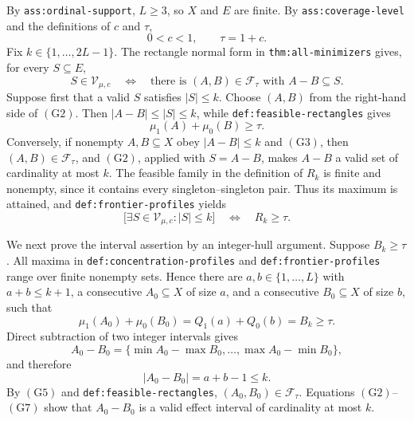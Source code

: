 By \texttt{ass:ordinal-support}, \(L\geq 3\), so \(X\) and \(E\) are finite.  By \texttt{ass:coverage-level} and the definitions of \(c\) and \(\tau\),
\[
0<c<1,\qquad \tau=1+c.
\tag{G1}
\]
Fix \(k\in\{1,\ldots,2L-1\}\).  The rectangle normal form in \texttt{thm:all-minimizers} gives, for every \(S\subseteq E\),
\[
S\in\mathcal V_{\mu,c}
\quad\Longleftrightarrow\quad
\text{there is }(A,B)\in\mathcal F_\tau\text{ with }A-B\subseteq S.
\tag{G2}
\]
Suppose first that a valid \(S\) satisfies \(|S|\leq k\).  Choose \((A,B)\) from the right-hand side of \((\mathrm{G2})\).  Then \(|A-B|\leq |S|\leq k\), while \texttt{def:feasible-rectangles} gives
\[
\mu_1(A)+\mu_0(B)\geq\tau.
\tag{G3}
\]
Conversely, if nonempty \(A,B\subseteq X\) obey \(|A-B|\leq k\) and \((\mathrm{G3})\), then \((A,B)\in\mathcal F_\tau\), and \((\mathrm{G2})\), applied with \(S=A-B\), makes \(A-B\) a valid set of cardinality at most \(k\).  The feasible family in the definition of \(R_k\) is finite and nonempty, since it contains every singleton--singleton pair.  Thus its maximum is attained, and \texttt{def:frontier-profiles} yields
\[
\bigl[\exists S\in\mathcal V_{\mu,c}:|S|\leq k\bigr]
\quad\Longleftrightarrow\quad R_k\geq\tau.
\tag{G4}
\]

We next prove the interval assertion by an integer-hull argument.  Suppose \(B_k\geq\tau\).  All maxima in \texttt{def:concentration-profiles} and \texttt{def:frontier-profiles} range over finite nonempty sets.  Hence there are \(a,b\in\{1,\ldots,L\}\) with \(a+b\leq k+1\), a consecutive \(A_0\subseteq X\) of size \(a\), and a consecutive \(B_0\subseteq X\) of size \(b\), such that
\[
\mu_1(A_0)+\mu_0(B_0)=Q_1(a)+Q_0(b)=B_k\geq\tau.
\tag{G5}
\]
Direct subtraction of two integer intervals gives
\[
A_0-B_0
=\{\min A_0-\max B_0,\ldots,\max A_0-\min B_0\},
\tag{G6}
\]
and therefore
\[
|A_0-B_0|=a+b-1\leq k.
\tag{G7}
\]
By \((\mathrm{G5})\) and \texttt{def:feasible-rectangles}, \((A_0,B_0)\in\mathcal F_\tau\).  Equations \((\mathrm{G2})\)--\((\mathrm{G7})\) show that \(A_0-B_0\) is a valid effect interval of cardinality at most \(k\).

